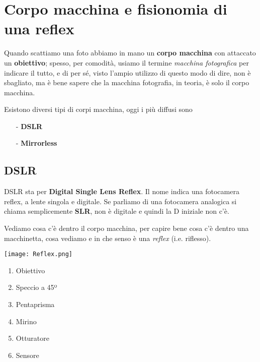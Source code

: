 \section{Corpo macchina e fisionomia di una reflex} \label{sec:fisionomia}

Quando scattiamo una foto abbiamo in mano un \textbf{corpo macchina} con attaccato un \textbf{obiettivo}; spesso, per comodità, usiamo il termine \textit{macchina fotografica} per indicare il tutto, e di per sé, visto l'ampio utilizzo di questo modo di dire, non è sbagliato, ma è bene sapere che la macchina fotografia, in teoria, è solo il corpo macchina.

Esistono diversi tipi di corpi macchina, oggi i più diffusi sono
\begin{itemize}
    \item[-] \textbf{DSLR}
    \item[-] \textbf{Mirrorless} 
\end{itemize}


\subsection{DSLR} \label{subsec:dslr}
DSLR sta per \textbf{Digital Single Lens Reflex}.\newline
Il nome indica una fotocamera reflex, a lente singola e digitale. Se parliamo di una fotocamera analogica si chiama semplicemente \textbf{SLR}, non è digitale e quindi la D iniziale non c'è.

Vediamo cosa c'è dentro il corpo macchina, per capire bene cosa c'è dentro una macchinetta, cosa vediamo e in che senso è una \textit{reflex} (i.e. riflesso).

\setlength{\columnsep}{2.8cm}
\begin{multicols}{2}
    \texttt{[image: Reflex.png]}

    \columnbreak

    \begin{enumerate}
        \setcounter{enumi}{0}
        \item Obiettivo
        \item Speccio a 45º
        \item Pentaprisma
        \item Mirino
        \item Otturatore
        \item Sensore
    \end{enumerate}
\end{multicols}

